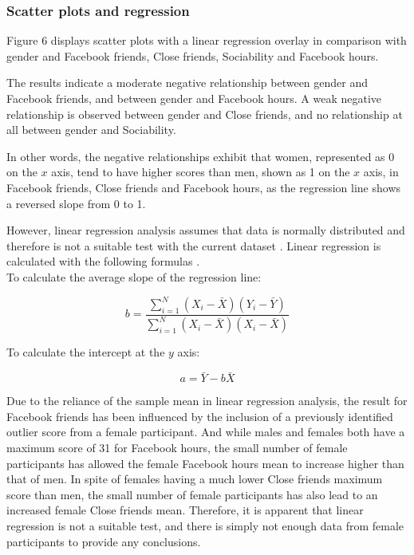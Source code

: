 
\subsubsection{Scatter plots and regression}

Figure 6 displays scatter plots with a linear regression overlay in comparison with gender and Facebook friends, Close friends, Sociability and Facebook hours.

The results indicate a moderate negative relationship between gender and Facebook friends, and between gender and Facebook hours. A weak negative relationship is observed between gender and Close friends, and no relationship at all between gender and Sociability.

In other words, the negative relationships exhibit that women, represented as 0 on the $x$ axis, tend to have higher scores than men, shown as 1 on the $x$ axis, in Facebook friends, Close friends and Facebook hours, as the regression line shows a reversed slope from 0 to 1.

However, linear regression analysis assumes that data is normally distributed and therefore is not a suitable test with the current dataset \citep[p. 263]{McKillup2011}. Linear regression is calculated with the following formulas \citep[p. 247-249]{McKillup2011}.\\

To calculate the average slope of the regression line:
 
$$b = \frac{\sum_{i=1}^N(X_i - \bar{X})(Y_i - \bar{Y})}{\sum_{i=1}^N(X_i - \bar{X})(X_i - \bar{X})}$$ \linebreak


To calculate the intercept at the $y$ axis:

$$a = \bar{Y} - b\bar{X}$$

Due to the reliance of the sample mean in linear regression analysis, the result for Facebook friends has been influenced by the inclusion of a previously identified outlier score from a female participant. And while males and females both have a maximum score of 31 for Facebook hours, the small number of female participants has allowed the female Facebook hours mean to increase higher than that of men. In spite of females having a much lower Close friends maximum score than men, the small number of female participants has also lead to an increased female Close friends mean. Therefore, it is apparent that linear regression is not a suitable test, and there is simply not enough data from female participants to provide any conclusions.

